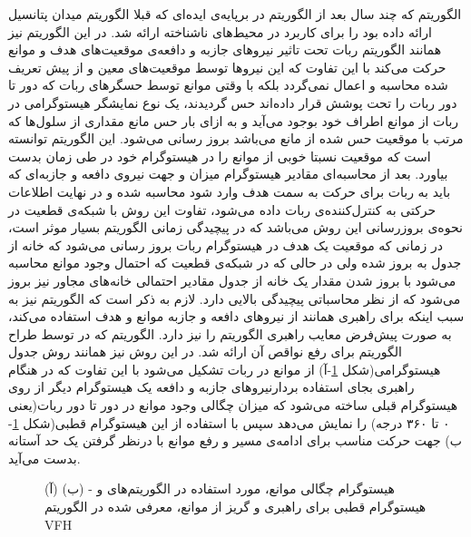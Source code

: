الگوریتم  که چند سال بعد از الگوریتم  در  برپایه‌ی ایده‌ای که قبلا الگوریتم میدان پتانسیل ارائه داده بود را برای کاربرد در محیط‌های ناشناخته ارائه شد. در این الگوریتم نیز همانند الگوریتم  ربات تحت تاثیر نیروهای جازبه و دافعه‌ی موقعیت‌های هدف و موانع حرکت می‌کند با این تفاوت که این نیروها توسط موقعیت‌های معین و از پیش تعریف شده محاسبه و اعمال نمی‌گردد بلکه با وقتی موانع توسط حسگرهای ربات که دور تا دور ربات را تحت پوشش قرار داده‌اند حس گردیدند، یک نوع نمایشگر هیستوگرامی در ربات از موانع اطراف خود بوجود می‌آید و به ازای بار حس مانع مقداری از سلول‌ها که مرتب با موقعیت حس شده از مانع می‌باشد بروز رسانی می‌شود. این الگوریتم توانسته است که موقعیت نسبتا خوبی از موانع را در هیستوگرام خود در طی زمان بدست بیاورد. بعد از محاسبه‌ای مقادیر هیستوگرام میزان و جهت نیروی دافعه و جازبه‌ای که باید به ربات برای حرکت به سمت هدف وارد شود محاسبه شده و در نهایت اطلاعات حرکتی به کنترل‌کننده‌ی ربات داده می‌شود، تفاوت این روش با شبکه‌ی قطعیت در نحوه‌ی بروزرسانی این روش می‌باشد که در پیچیدگی زمانی الگوریتم بسیار موثر است، در  زمانی که موقعیت یک هدف در هیستوگرام ربات بروز رسانی می‌شود که خانه از جدول به بروز شده ولی در حالی که در شبکه‌ی قطعیت که احتمال وجود موانع محاسبه‌ می‌شود با بروز شدن مقدار یک خانه از جدول مقادیر احتمالی خانه‌های مجاور نیز بروز می‌شود که از نظر محاسباتی پیچیدگی بالایی دارد. لازم به ذکر است که الگوریتم  نیز به سبب اینکه برای راهبری همانند  از نیروهای دافعه و جازبه موانع و هدف استفاده می‌کند، به صورت پیش‌فرض معایب راهبری الگوریتم  را نیز دارد.
الگوریتم  که در  توسط طراح الگوریتم  برای رفع نواقص آن ارائه شد. در این روش نیز همانند روش  جدول هیستوگرامی(شکل \ref{fig:vff_vfh_histo}-آ) از موانع در ربات تشکیل می‌شود با این تفاوت که در هنگام راهبری بجای استفاده‌ بردارنیرو‌های جازبه و دافعه یک هیستوگرام دیگر از روی هیستوگرام قبلی ساخته می‌شود که میزان چگالی وجود موانع در دور تا دور ربات(یعنی ۰ تا ۳۶۰ درجه) را نمایش می‌دهد سپس با استفاده از این هیستوگرام قطبی(شکل \ref{fig:vff_vfh_histo}-ب) جهت حرکت مناسب برای ادامه‌ی مسیر و رفع موانع با درنظر گرفتن یک حد آستانه بدست می‌آید.

\begin{figure}
\centering
{}
\caption{(آ) هیستوگرام‌ چگالی موانع، مورد استفاده در الگوریتم‌های  و  - (ب) هیستوگرام قطبی برای راهبری و گریز از موانع، معرفی شده در الگوریتم VFH}
\label{fig:vff_vfh_histo}
\end{figure}

